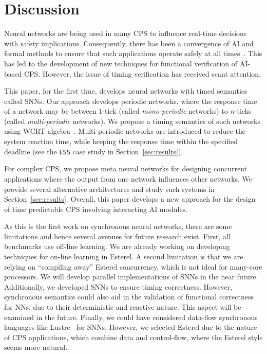 \section{Discussion}
\label{sec:conclusions}

Neural networks are being used in many \acf{CPS} to influence
real-time decisions with safety implications. Consequently, there has
been a convergence of AI and formal methods to ensure that such
applications operate safely at all times~\cite{seshia2016towards}. This has led to the development of new
techniques for functional verification of AI-based \ac{CPS}. However,
the issue of timing verification has received scant attention. 

This paper, for the first time, develops neural networks with timed
semantics called \acfp{SNN}. Our approach develops periodic networks,
where the response time of a network may be between $1$-tick (called
\emph{mono-periodic} networks) to $n$-ticks (called
\emph{multi-periodic} networks). We propose a timing semantics of such
networks using \ac{WCRT}-algebra~\cite{wang2017timing}. Multi-periodic networks are
introduced to reduce the system reaction time, while keeping the
response time within the specified deadline (see the \texttt{ESS} case
study in Section~\ref{sec:results}). 

For complex CPS, we propose meta neural networks for designing concurrent applications where the output from
one network influences other networks. We provide several alternative
architectures and study such systems in
Section~\ref{sec:results}. Overall, this paper develops a new approach
for the design of time predictable \acf{CPS} involving interacting 
AI modules.

As this is the first work on synchronous neural networks,
there are some limitations and hence several avenues
for future research exist. First, all benchmarks use off-line learning. We are already
working on developing techniques for on-line learning in Esterel. A
second limitation is that we are relying on ``compiling away'' Esterel
concurrency, which is not ideal for many-core processors. We will develop parallel implementations
of \acp{SNN} in the near future. 
Additionally, we developed \acp{SNN} to ensure timing correctness. 
However, synchronous semantics could also aid in the
validation of functional correctness for \acp{NN}, due to their
deterministic and reactive nature. This aspect will be examined in the future.
Finally, we could have considered
data-flow synchronous languages like Lustre~\cite{benveniste2003synchronous} for
\acp{SNN}. However, we selected Esterel due to the nature of \ac{CPS}
applications, which combine data and control-flow, where the Esterel
style seems more natural.